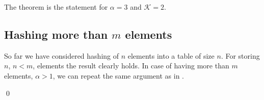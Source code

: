 The theorem is the statement for $\alpha = 3$ and $\mathcal{K} = 2$.

\subsection{Hashing more than $m$ elements}

So far we have considered hashing of $n$ elements into a table of size $n$. For storing $n$, $n < m$, elements the result clearly holds.
In case of having more than $m$ elements, $\alpha > 1$, we can repeat the same argument as in \cite{DBLP:journals/jacm/Vocking03}.

\qed
